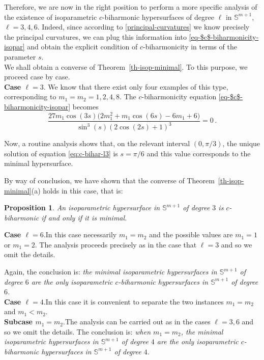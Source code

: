 \documentclass[11pt,leqno]{amsart}
\theoremstyle{plain}
\newtheorem{proposition}  [theorem]  {Proposition}
\theoremstyle{definition}
\numberwithin{equation}{section}
\def \s{{\mathbb S}}
\numberwithin{equation}{section}
\begin{document}
{Therefore, we are now in the right position to perform a more specific analysis of the existence of isoparametric $c$-biharmonic  hypersurfaces of degree $\ell$ in $\s^{m+1}$, $\ell=3,4,6$. 
Indeed, since according to \eqref{principal-curvatures} we know precisely the principal curvatures, we can plug this information into \eqref{eq-$c$-biharmonicity-isopar} and obtain the explicit condition of $c$-biharmonicity in terms of the parameter $s$.\\

We shall obtain a converse of Theorem~\ref{th-isop-minimal}. To this purpose, we proceed case by case. \\

\textbf{Case $\ell=3$}. \quad We know that there exist only four examples of this type, corresponding to $m_1=m_2=1,2,4,8$. The $c$-biharmonicity equation \eqref{eq-$c$-biharmonicity-isopar} becomes
\begin{equation}\label{eq:c-bihar-l3}
\frac{27 m_1 \cos (3 s)  \Big(2 m_1^2+m_1 \cos (6 s)-6 m_1+6\Big)}{\sin^3(s)(2 \cos (2 s)+1)^3}=0\,.
\end{equation}

Now, a routine analysis shows that, on the relevant interval $(0,\pi/3)$, the unique solution of equation \eqref{eq:c-bihar-l3} is $s=\pi/6$ and this value corresponds to the minimal hypersurface.

By way of conclusion, we have shown that the converse of Theorem~\ref{th-isop-minimal}(a) holds in this case, that is:
\begin{proposition}\label{pro-c-biharmonic-iso-l3}
An isoparametric hypersurface in $\s^{m+1}$ of degree $3$ is $c$-biharmonic if and only if it is minimal.
\end{proposition}


\textbf{Case $\ell=6$}.\quad In this case necessarily $m_1=m_2$ and the possible values are $m_1=1$ or $m_1=2$. The analysis proceeds precisely as in the case that $\ell=3$ and so we omit the details. 

Again, the conclusion is: \textit{the minimal isoparametric hypersurfaces in $\s^{m+1}$ of degree $6$ are the only isoparametric $c$-biharmonic hypersurfaces in $\s^{m+1}$ of degree $6$.}\\

\textbf{Case $\ell=4$}.\quad In this case it is convenient to separate the two instances $m_1=m_2$ and $m_1< m_2$.\\

\textbf{Subcase $m_1=m_2$}.\quad The analysis can be carried out as in the cases $\ell=3,6$ and so we omit the details. 
The conclusion is: \textit{when $m_1=m_2$, the minimal isoparametric hypersurfaces in $\s^{m+1}$ of degree $4$ are the only isoparametric $c$-biharmonic hypersurfaces in $\s^{m+1}$ of degree $4$.}\\

}
\end{document}
